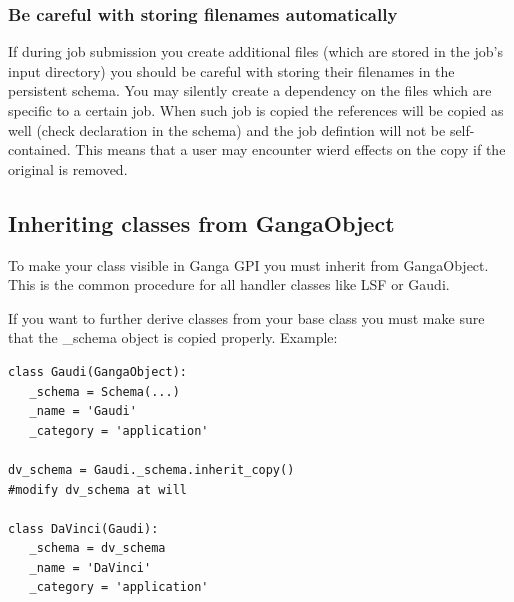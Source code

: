 \documentclass{howto}
\begin{document}
\subsubsection{Be careful with storing filenames automatically }

If during job submission you create additional files (which are stored
in the job's input directory) you should be careful with storing their
filenames  in  the  persistent  schema.   You may  silently  create  a
dependency on the files which are specific to a certain job. When such
job  is  copied   the  references  will  be  copied   as  well  (check
 declaration in the  schema) and the job defintion will
not  be self-contained.  This means  that a  user may  encounter wierd
effects on the copy if the original is removed.

\subsection{Inheriting classes from GangaObject}

To  make  your  class visible  in  Ganga  GPI  you must  inherit  from
GangaObject. This is the common procedure for all handler classes like
LSF or Gaudi.

If you  want to further derive  classes from your base  class you must
make sure that the _schema object is copied properly. Example:

\begin{verbatim}
class Gaudi(GangaObject):
   _schema = Schema(...)
   _name = 'Gaudi'
   _category = 'application'

dv_schema = Gaudi._schema.inherit_copy()
#modify dv_schema at will

class DaVinci(Gaudi):
   _schema = dv_schema
   _name = 'DaVinci'
   _category = 'application'
\end{verbatim}
\end{document}
